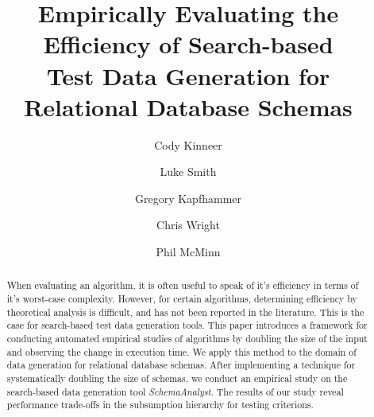 \documentclass[times,10pt,twocolumn]{article}
\begin{document}
\title{Empirically Evaluating the Efficiency of Search-based \\ Test Data
Generation for Relational Database Schemas}

\author{Cody Kinneer         \and
        Luke Smith \and
        Gregory Kapfhammer \and
        Chris Wright \and
        Phil McMinn \vspace*{-.1in}
      }



\maketitle

\begin{abstract}
When evaluating an algorithm, it is often useful to speak of it's
efficiency in terms of it's worst-case complexity.  However, for certain
algorithms, determining efficiency by theoretical analysis is difficult,
and has not been reported in the literature. This is the case for
search-based test data generation tools. This paper introduces a
framework for conducting automated empirical studies of algorithms by
doubling the size of the input and observing the change in execution
time. We apply this method to the domain of data generation for
relational database schemas.  After implementing a technique for
systematically doubling the size of schemas, we conduct an empirical study
on the search-based data generation tool \textit{SchemaAnalyst}. The results of
our study reveal performance trade-offs in the subsumption hierarchy for
testing criterions.

\end{abstract}






%
%



\end{document}
